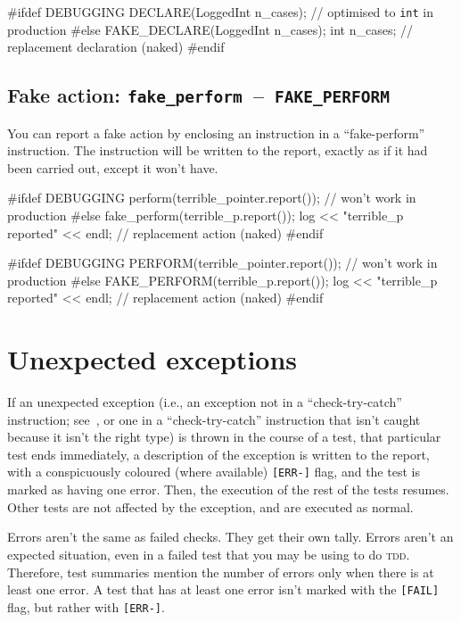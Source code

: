 \documentclass[twoside, a4paper, article]{memoir}
\newcommand*\testudocolor{\color{red!80!blue}}
\newcommand*\testudo[1]{\texttt{\testudocolor{}#1}}
\newcommand*\testudopair[2]{\testudo{#1}~--~\testudo{#2}}
\newcommand\subsectiontestudopair[3]{%
  \subsection[#1]{#1: \testudopair{#2}{#3}}}
\begin{document}
\begin{cpplisting}
#ifdef DEBUGGING
DECLARE(LoggedInt n_cases); // optimised to \texttt{int} in production
#else
FAKE_DECLARE(LoggedInt n_cases);
int n_cases; // replacement declaration (naked)
#endif
\end{cpplisting}


\subsectiontestudopair{Fake action}{fake\_perform}{FAKE\_PERFORM}
\label{sec:fake-action}

You can report a fake action by enclosing an instruction in a ``fake-perform''
instruction.  The instruction will be written to the report, exactly as if it
had been carried out, except it won't have.
\begin{cpplisting}
#ifdef DEBUGGING
perform(terrible_pointer.report()); // won't work in production
#else
fake_perform(terrible_p.report());
log << "terrible_p reported" << endl; // replacement action (naked)
#endif
\end{cpplisting}

\begin{cpplisting}
#ifdef DEBUGGING
PERFORM(terrible_pointer.report()); // won't work in production
#else
FAKE_PERFORM(terrible_p.report());
log << "terrible_p reported" << endl; // replacement action (naked)
#endif
\end{cpplisting}


\section{Unexpected exceptions}
\label{sec:unexpected-exceptions}

If an unexpected exception (i.e., an exception not in a ``check-try-catch''
instruction; see~, or one in a ``check-try-catch''
instruction that isn't caught because it isn't the right type) is thrown in the
course of a test, that particular test ends immediately, a description of the
exception is written to the report, with a conspicuously coloured (where
available) \verb|[ERR-]| flag, and the test is marked as having one error.
Then, the execution of the rest of the tests resumes.  Other tests are not
affected by the exception, and are executed as normal.

Errors aren't the same as failed checks.  They get their own tally.  Errors
aren't an expected situation, even in a failed test that you may be using to do
\textsc{tdd}.  Therefore, test summaries mention the number of errors only
when there is at least one error.  A test that has at least one error isn't
marked with the \verb|[FAIL]| flag, but rather with \verb|[ERR-]|.
\end{document}
